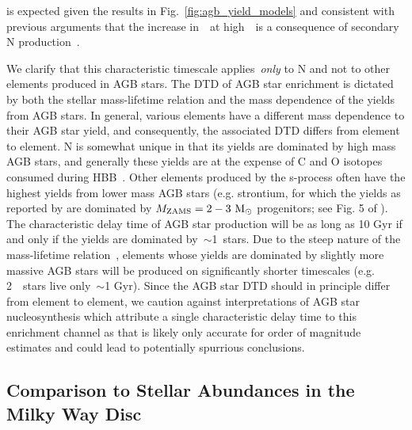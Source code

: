 \documentclass[ms.tex]{subfiles}
\begin{document}
is expected given the results in Fig.~\ref{fig:agb_yield_models} and consistent
with previous arguments that the increase in~\no~at high~\oh~is a consequence
of secondary N production~\citep{VilaCostas1993, vanZee1998, Henry1999,
PerezMontero2009, Berg2012, Pilyugin2012, Andrews2013, HaydenPawson2021}.
\par
We clarify that this characteristic timescale applies~\textit{only} to N and
not to other elements produced in AGB stars.
The DTD of AGB star enrichment is dictated by both the stellar mass-lifetime
relation and the mass dependence of the yields from AGB stars.
In general, various elements have a different mass dependence to their AGB
star yield, and consequently, the associated DTD differs from element to
element.
N is somewhat unique in that its yields are dominated by high mass AGB stars,
and generally these yields are at the expense of C and O isotopes consumed
during HBB~\citep{Ventura2013}.
Other elements produced by the s-process often have the highest yields from
lower mass AGB stars (e.g. strontium, for which the yields as reported by
\citealp{Cristallo2011, Cristallo2015} are dominated by
$M_\text{ZAMS} = 2 - 3~\text{M}_\odot$ progenitors; see Fig. 5 of
\citealp{Johnson2020}).
The characteristic delay time of AGB star production will be as long as 10 Gyr
if and only if the yields are dominated by~$\sim$1~\msun stars.
Due to the steep nature of the mass-lifetime relation~\citep{Larson1974,
Maeder1989, Padovani1993}, elements whose yields are dominated by slightly more
massive AGB stars will be produced on significantly shorter timescales (e.g.
2~\msun~stars live only~$\sim$1 Gyr).
Since the AGB star DTD should in principle differ from element to element, we
caution against interpretations of AGB star nucleosynthesis which attribute
a single characteristic delay time to this enrichment channel as that is likely
only accurate for order of magnitude estimates and could lead to potentially
spurrious conclusions.


\subsection{Comparison to Stellar Abundances in the Milky Way Disc}
\label{sec:results:vincenzo_comp}
\end{document}
